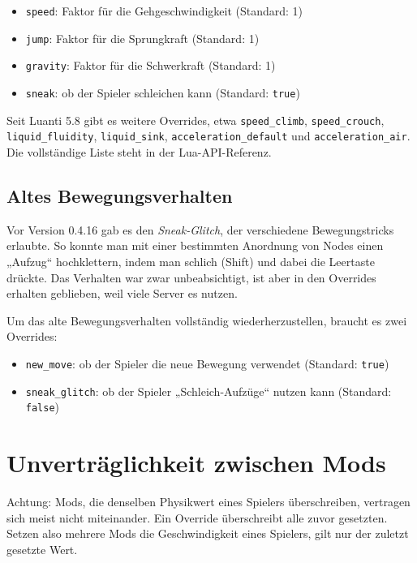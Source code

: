 \begin{itemize}
\tightlist
\item
  \texttt{speed}: Faktor für die Gehgeschwindigkeit (Standard: 1)
\item
  \texttt{jump}: Faktor für die Sprungkraft (Standard: 1)
\item
  \texttt{gravity}: Faktor für die Schwerkraft (Standard: 1)
\item
  \texttt{sneak}: ob der Spieler schleichen kann (Standard:
  \texttt{true})
\end{itemize}

Seit Luanti 5.8 gibt es weitere Overrides, etwa
\texttt{speed\_\allowbreak{}climb}, \texttt{speed\_\allowbreak{}crouch},
\texttt{liquid\_\allowbreak{}fluidity},
\texttt{liquid\_\allowbreak{}sink},
\texttt{acceleration\_\allowbreak{}default} und
\texttt{acceleration\_\allowbreak{}air}. Die vollständige Liste steht in
der Lua-API-Referenz.

\subsection{Altes Bewegungsverhalten}\label{altes-bewegungsverhalten}

Vor Version 0.4.16 gab es den \emph{Sneak-Glitch}, der verschiedene
Bewegungstricks erlaubte. So konnte man mit einer bestimmten Anordnung
von Nodes einen „Aufzug`` hochklettern, indem man schlich (Shift) und
dabei die Leertaste drückte. Das Verhalten war zwar unbeabsichtigt, ist
aber in den Overrides erhalten geblieben, weil viele Server es nutzen.

Um das alte Bewegungsverhalten vollständig wiederherzustellen, braucht
es zwei Overrides:

\begin{itemize}
\tightlist
\item
  \texttt{new\_\allowbreak{}move}: ob der Spieler die neue Bewegung
  verwendet (Standard: \texttt{true})
\item
  \texttt{sneak\_\allowbreak{}glitch}: ob der Spieler
  „Schleich-Aufzüge`` nutzen kann (Standard: \texttt{false})
\end{itemize}

\section{Unverträglichkeit zwischen
Mods}\label{unvertruxe4glichkeit-zwischen-mods}

Achtung: Mods, die denselben Physikwert eines Spielers überschreiben,
vertragen sich meist nicht miteinander. Ein Override überschreibt alle
zuvor gesetzten. Setzen also mehrere Mods die Geschwindigkeit eines
Spielers, gilt nur der zuletzt gesetzte Wert.

